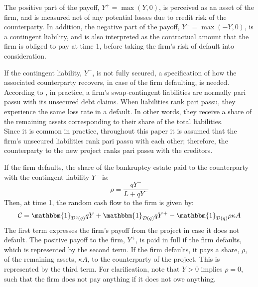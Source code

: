 \documentclass[main.tex]{subfiles}
\begin{document}
        The positive part of the payoff, $Y^{+}=\max\left(Y,0\right)$, is perceived as an asset of the firm, and is measured net of any potential losses due to credit risk of the counterparty.
        In addition, the negative part of the payoff, $Y^{-} = \max \left(-Y,0\right)$, is a contingent liability, and is also interpreted as the contractual amount that the firm is obliged to pay at time 1, before taking the firm's risk of default into consideration.

        If the contingent liability, $Y^{-}$, is not fully secured, a specification of how the associated counterparty recovers, in case of the firm defaulting, is needed.
        According to \textcite{ADS2019}, in practice, a firm's swap-contingent liabilities 
        are normally pari passu with its unsecured debt claims.
        When liabilities rank pari passu, they experience the same loss rate in a default.
        In other words, they receive a share of the remaining assets 
        corresponding to their share of the total liabilities.
        \\
        Since it is common in practice, throughout this paper it is assumed that the firm's 
        unsecured liabilities rank pari passu with each other;
        therefore, the counterparty to the new project ranks pari passu with the creditors.

        If the firm defaults, the share of the bankruptcy estate paid to the counterparty with 
        the contingent liability $Y^{-}$ is:
            \begin{equation*}
                \rho = 
                \frac{
                    qY^{-}
                }{
                    L + qY^{-}
                } 
            \end{equation*}
        Then, at time 1, the random cash flow to the firm is given by:
        \begin{equation*}
            \mathcal{C} 
            = 
            \mathbbm{1}_{\mathcal{D}^{c}(q)} qY
            + \mathbbm{1}_{\mathcal{D}(q)} qY^{+}
            - \mathbbm{1}_{\mathcal{D}(q)} \rho \kappa A
        \end{equation*}
        The first term expresses the firm's payoff from the project in case it does not default. 
        The positive payoff to the firm, $Y^{+}$, is paid in full if the firm defaults,
        which is represented by the second term.
        If the firm defaults, it pays a share, $\rho$, of the remaining assets, $\kappa A$,
        to the counterparty of the project.
        This is represented by the third term.
        For clarification, note that $Y > 0$ implies $\rho=0$, 
        such that the firm does not pay anything if it does not owe anything.
\end{document}
